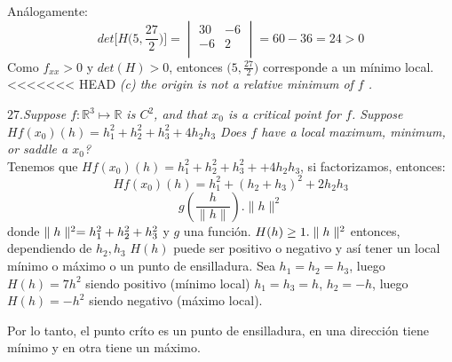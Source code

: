 \documentclass[a4paper,12pt]{article}
\begin{document}
				Análogamente:\\
				$$det \Big[H \Big(5, \frac{27}{2}\Big)\Big] =
						\begin{vmatrix}
							30 & -6 \\
							-6  & 2 \\
						\end{vmatrix} = 60 - 36 = 24 > 0
				$$
				Como $f_{xx} > 0$ y $det(H) > 0$, entonces $\Big(5, \frac{27}{2}\Big)$
				corresponde a un mínimo local.\\

<<<<<<< HEAD
	\textit{(c) the origin is not a relative minimum of $f$ .}\\
	\newline


\textit{\textbf{$27.$}Suppose $f: \mathbb{R}^3 \mapsto \mathbb{R}$ is $C^2$, and that $x_{0}$ is a critical point for $f$. Suppose $Hf (x_{0})(h) = h_{1}^2 + h_{2}^2 + h_{3}^2 + 4h_{2}h_{3}$ Does $f$ have a local maximum, minimum, or saddle a $x_{0}$?}\\

Tenemos que $Hf(x_0)(h) = h_1^2+h_2^2+h_3^2++4h_2  h_3$, si factorizamos, entonces:
\[Hf(x_0)(h)= h_1^2+(h_2+h_3)^2+2h_2h_3\]
\[g \left( \dfrac{h}{ \parallel h \parallel}\right). \parallel h \parallel^2\]
donde $\parallel h\parallel ^2 = h_1^2+h_2^2+h_3^2$ y $g $ una función. $H(h)\geq 1. \parallel h\parallel^2$ entonces, dependiendo de $h_2, h_3$  $H(h)$ puede ser positivo o negativo y así tener un local mínimo o máximo o un punto de ensilladura.
Sea $h_1=h_2=h_3$, luego $H(h)= 7h^2$ siendo positivo (mínimo local)
$h_1=h_3= h$, $h_2 = -h$, luego $H(h) = -h^2$ siendo negativo (máximo local).

Por lo tanto, el punto críto es un punto de ensilladura, en una dirección tiene mínimo y en otra tiene un máximo.\\
\end{document}

